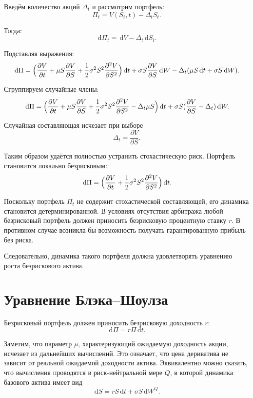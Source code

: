 \documentclass[12pt]{article}
\newcommand{\dd}{\,\mathrm{d}}
\newcommand{\pd}[2]{\frac{\partial #1}{\partial #2}}
\newcommand{\pdd}[2]{\frac{\partial^2 #1}{\partial #2^2}}
\begin{document}
Введём количество акций $\Delta_t$ и рассмотрим портфель:
\[
\Pi_t = V(S_t,t) - \Delta_t S_t.
\]

Тогда:
\[
\dd \Pi_t = \dd V - \Delta_t \dd S_t.
\]

Подставляя выражения:
\[
\dd \Pi =
\Bigl(\pd{V}{t} + \mu S \pd{V}{S} + \frac{1}{2}\sigma^2 S^2 \pdd{V}{S}\Bigr)\dd t
+ \sigma S \pd{V}{S}\dd W
- \Delta_t(\mu S\dd t + \sigma S\dd W).
\]

Сгруппируем случайные члены:
\[
\dd \Pi =
\Bigl(\pd{V}{t} + \mu S \pd{V}{S}
+ \frac{1}{2}\sigma^2 S^2 \pdd{V}{S}
- \Delta_t\mu S\Bigr)\dd t
+ \sigma S(\pd{V}{S}-\Delta_t)\dd W.
\]

Случайная составляющая исчезает при выборе
\begin{equation}
\Delta_t=\pd{V}{S}.
\end{equation}

Таким образом удаётся полностью устранить стохастическую риск.
Портфель становится локально безрисковым:
\begin{equation}
\dd \Pi =
\Bigl(\pd{V}{t} + \frac{1}{2}\sigma^2 S^2 \pdd{V}{S}\Bigr)\dd t.
\end{equation}

Поскольку портфель $\Pi_t$ не содержит стохастической составляющей,
его динамика становится детерминированной. В условиях отсутствия
арбитража любой безрисковый портфель должен приносить безрисковую
процентную ставку $r$. В противном случае возникла бы возможность
получать гарантированную прибыль без риска.

Следовательно, динамика такого портфеля должна удовлетворять
уравнению роста безрискового актива.

\section{Уравнение Блэка--Шоулза}

Безрисковый портфель должен приносить безрисковую доходность $r$:
\begin{equation}
\dd \Pi = r\Pi \dd t.
\end{equation}

Заметим, что параметр $\mu$, характеризующий ожидаемую доходность акции,
исчезает из дальнейших вычислений. Это означает, что цена дериватива
не зависит от реальной ожидаемой доходности актива. Эквивалентно можно
сказать, что вычисления проводятся в риск-нейтральной мере $Q$, в которой
динамика базового актива имеет вид
\[
\dd S = r S \dd t + \sigma S \dd W^Q .
\]
\end{document}
